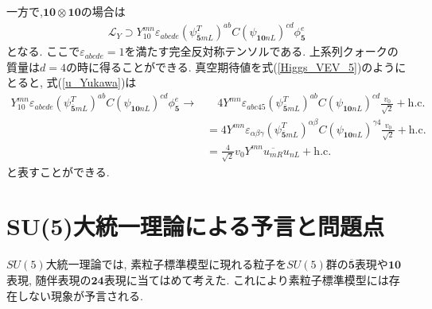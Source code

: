 一方で,$ \bm{10}\otimes \bm{10}$の場合は
\begin{align}
  \mathcal{L}_Y \supset Y_{10}^{mn} \varepsilon_{abcde} (\psi^{T}_{\bm{\overline{5}}mL})^{ab}C (\psi_{\bm{10}nL})^{cd} \phi_{\bm{5}}^e \label{u_Yukawa}
\end{align}
となる.
ここで$\varepsilon_{abcde}=1$を満たす完全反対称テンソルである.
上系列クォークの質量は$d=4$の時に得ることができる.
真空期待値を式(\ref{Higgs_VEV_5})のようにとると, 式(\ref{u_Yukawa})は
\begin{align}
  Y_{10}^{mn} \varepsilon_{abcde} (\psi^{T}_{\bm{\overline{5}}mL})^{ab}C (\psi_{\bm{10}nL})^{cd} \phi_{\bm{5}}^e \rightarrow&\quad 4Y^{mn} \varepsilon_{abc45} (\psi^{T}_{\bm{\overline{5}}mL})^{ab}C (\psi_{\bm{10}nL})^{cd}\frac{v_0}{\sqrt{2}} + \mathrm{h.c.} \nonumber\\
                                                                                                            &= 4Y^{mn} \varepsilon_{\alpha \beta \gamma} (\psi^{T}_{\bm{\overline{5}}mL})^{\alpha\beta}C (\psi_{\bm{10}nL})^{\gamma 4}\frac{v_0}{\sqrt{2}} + \mathrm{h.c.}\nonumber\\
                                          &= \frac{4}{\sqrt{2}}v_0 Y^{mn}\overline{u_{mR}}u_{nL} + \mathrm{h.c.}
\end{align}
と表すことができる.
\section{SU(5)大統一理論による予言と問題点}
$SU(5)$大統一理論では, 素粒子標準模型に現れる粒子を$SU(5)$群の$\overline{\bm{5}}$表現や$\bm{10}$表現, 随伴表現の$\bm{24}$表現に当てはめて考えた.
これにより素粒子標準模型には存在しない現象が予言される.
